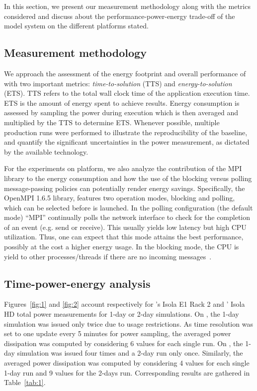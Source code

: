 In this section, we present our measurement methodology along with the
metrics  considered  and  discuss about  the  performance-power-energy
trade-off of the model system on the different platforms stated.

\subsection{Measurement methodology}
\label{subsec:4.1}

We  approach  the  assessment  of  the energy  footprint  and  overall
performance    of    \cosmoart    with    two    important    metrics:
\textit{time-to-solution} (TTS) and \textit{energy-to-solution} (ETS).
TTS refers to  the total wall clock time  of the application execution
time. ETS  is the amount of  energy spent to  achieve results.  Energy
consumption is  assessed by sampling the power  during execution which
is then averaged and multiplied  by the TTS to determine ETS. Whenever
possible, multiple  production runs  were performed to  illustrate the
reproducibility  of   the  baseline,  and   quantify  the  significant
uncertainties in  the power measurement, as dictated  by the available
technology.

For  the   experiments  on  \tinto  platform,  we   also  analyze  the
contribution of the MPI library  to the energy consumption and how the
use  of  the  blocking  versus polling  message-passing  policies  can
potentially  render energy  savings. Specifically,  the  OpenMPI 1.6.5
library, features two operation modes, blocking and polling, which can
be selected before \cosmoart is launched. In the polling configuration
(the default mode) ``MPI''  continually polls the network interface to
check for  the completion  of an event  (e.g. send or  receive).  This
usually yields  low latency  but high CPU  utilization. Thus,  one can
expect that  this mode attains  the best performance, possibly  at the
cost a higher energy usage. In  the blocking mode, the CPU is yield to
other     processes/threads    if     there     are    no     incoming
messages~\cite{Castillo-2012}.

\subsection{Time-power-energy analysis}
\label{subsec:4.2}

Figures~\ref{fig:1} and \ref{fig:2}  account respectively for \monch's
Isola  E1 Rack 2  and \pilat'  Isola HD  total power  measurements for
1-day or 2-day simulations. On \monch, the 1-day simulation was issued
only twice due  to usage restrictions.  As time  resolution was set to
one  update every  5 minutes  for power  sampling, the  averaged power
dissipation was computed by considering  6 values for each single run.
On \pilat, the 1-day simulation was  issued four times and a 2-day run
only once.  Similarly, the  averaged power dissipation was computed by
considering 4  values for each single  1-day run and 9  values for the
2-days run. Corresponding results are gathered in Table~\ref{tab:1}.

